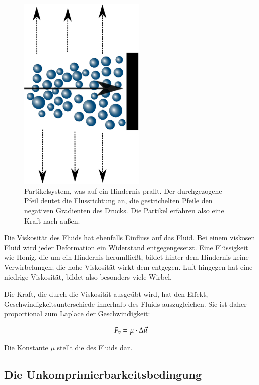 \begin{figure}[ht]
\includegraphics[width=6cm]{images/particle_system_wall_collision}
\caption{Partikelsystem, was auf ein Hindernis prallt. Der durchgezogene Pfeil deutet die Flussrichtung an, die gestrichelten Pfeile den negativen Gradienten des Drucks. Die Partikel erfahren also eine Kraft nach außen.}
\label{fig:navier_stokes_particle_system_wall_collision}
\end{figure}

Die Viskosität des Fluids hat ebenfalls Einfluss auf das Fluid. Bei einem
viskosen Fluid wird jeder Deformation ein Widerstand entgegengesetzt. Eine
Flüssigkeit wie Honig, die um ein Hindernis herumfließt, bildet hinter dem
Hindernis keine Verwirbelungen; die hohe Viskosität wirkt dem entgegen. Luft
hingegen hat eine niedrige Viskosität, bildet also besonders viele Wirbel.


Die Kraft, die durch die Viskosität ausgeübt wird, hat den Effekt,
Geschwindigkeitsunterschiede innerhalb des Fluids auszugleichen. Sie ist
daher proportional zum Laplace der Geschwindigkeit:

\begin{equation}
\label{eq:navier_stokes_f_v}
F_v = \mu \cdot \Delta \vec{u}
\end{equation}

Die Konstante $\mu$ stellt die 
des Fluids dar.

\subsection{Die Unkomprimierbarkeitsbedingung}
\label{sec:mathematics_incompressibility_condition_section}

